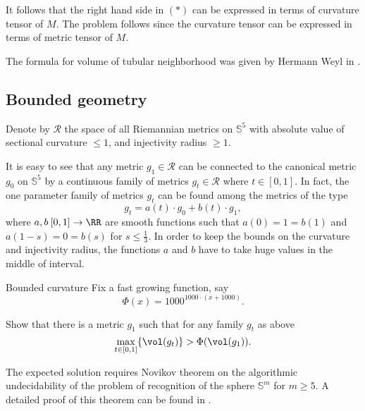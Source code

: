 It follows that the right hand side in $({*})$ can be expressed in terms of curvature tensor of $M$.
The problem follows since the curvature tensor can be expressed in terms of metric tensor of $M$.\qeds


The formula for volume of tubular neighborhood 
was given by Hermann Weyl in \cite{weyl}.
























\subsection*{Bounded geometry}

Denote by $\mathcal{R}$ the space of 
all Riemannian metrics on $\mathbb S^5$
with absolute value of sectional curvature $\le1$,
and injectivity radius $\ge1$.

It is easy to see that any metric $g_1\in \mathcal{R}$ 
can be connected to the canonical metric $g_0$ on $\mathbb S^5$
by a continuous family of metrics $g_t\in \mathcal{R}$ where $t\in[0,1]$.
In fact, the one parameter family of metrics $g_t$
can be found among the metrics of the type 
\[g_t=a(t)\cdot g_0+b(t)\cdot g_1,\]
where $a,b\:[0,1]\to\RR$
are smooth functions such that $a(0)=1=b(1)$ and $a(1-s)=0=b(s)$ for $s\le \tfrac13$.
In order to keep the bounds on the curvature and injectivity radius,
the functions $a$ and $b$
have to take huge values in the middle of interval.

\begin{pr}{\thm}{Bounded curvature}\label{Bounded curvature}
Fix a fast growing function, say
\[\Phi(x)=1000^{1000\cdot (x+1000)}.\]

Show that there is a metric $g_1$ 
such that 
for any family $g_t$ as above
\[\max_{t\in[0,1]}\{\vol(g_t)\}
>
\Phi(\vol(g_1)).\]
\end{pr}

The expected solution requires Novikov theorem on the algorithmic undecidability of the problem of recognition of the sphere $\mathbb S^m$  for
$m\ge 5$. 
A detailed proof of this theorem can be found in \cite{nabutovsky-NovThm}.



